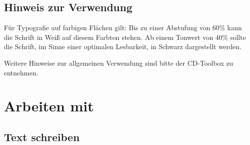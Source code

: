 \subsection{Hinweis zur Verwendung}

Für Typografie auf farbigen Flächen gilt: Bis zu einer Abstufung von 60\% kann die Schrift in Weiß auf diesem Farbton stehen. Ab einem Tonwert von 40\% sollte die Schrift, im Sinne einer optimalen Lesbarkeit, in Schwarz dargestellt werden. 

Weitere Hinweise zur allgemeinen Verwendung sind bitte der
CD-Toolbox\cite{toolbox} zu entnehmen.


\section{Arbeiten mit \tubslatex}

\subsection{Text schreiben}





